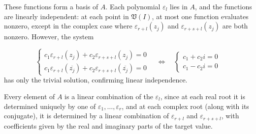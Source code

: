 \documentclass{amsart}
\begin{document}
These functions form a basis of $A$. Each polynomial $\varepsilon_l$ lies in $A$, and the functions are linearly independent: at each point in $\mathfrak{V}(I)$, at most one function evaluates nonzero, except in the complex case where $\varepsilon_{r+l}(z_j)$ and $\varepsilon_{r+s+l}(z_j)$ are both nonzero. However, the system

\[
\begin{cases}
c_1 \varepsilon_{r+l}(z_j) + c_2 \varepsilon_{r+s+l}(z_j) = 0 \\
c_1 \varepsilon_{r+l}(\overline{z_j}) + c_2 \varepsilon_{r+s+l}(\overline{z_j}) = 0
\end{cases}
\quad \Longleftrightarrow \quad
\begin{cases}
c_1 + c_2 i = 0 \\
c_1 - c_2 i = 0
\end{cases}
\]
has only the trivial solution, confirming linear independence.

Every element of $A$ is a linear combination of the $\varepsilon_l$, since at each real root it is determined uniquely by one of $\varepsilon_1, \ldots, \varepsilon_r$, and at each complex root (along with its conjugate), it is determined by a linear combination of $\varepsilon_{r+l}$ and $\varepsilon_{r+s+l}$, with coefficients given by the real and imaginary parts of the target value.
\end{document}
